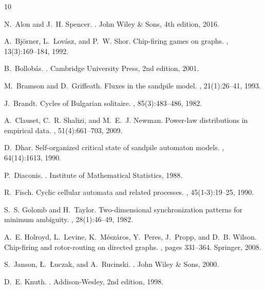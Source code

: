 \documentclass[11pt]{article}
\theoremstyle{definition}
\theoremstyle{remark}
\begin{document}
\begin{thebibliography}{10}

N.~Alon and J.~H. Spencer.
.
\newblock John Wiley \& Sons, 4th edition, 2016.

A.~Bj\"{o}rner, L.~Lov\'{a}sz, and P.~W. Shor.
\newblock Chip-firing games on graphs.
, 13(3):169--184, 1992.

B.~Bollob\'{a}s.
.
\newblock Cambridge University Press, 2nd edition, 2001.

M.~Bramson and D.~Griffeath.
\newblock Fluxes in the sandpile model.
, 21(1):26--41, 1993.

J.~Brandt.
\newblock Cycles of Bulgarian solitaire.
, 85(3):483--486, 1982.

A.~Clauset, C.~R. Shalizi, and M.~E.~J. Newman.
\newblock Power-law distributions in empirical data.
, 51(4):661--703, 2009.

D.~Dhar.
\newblock Self-organized critical state of sandpile automaton models.
, 64(14):1613, 1990.

P.~Diaconis.
.
\newblock Institute of Mathematical Statistics, 1988.

R.~Fisch.
\newblock Cyclic cellular automata and related processes.
, 45(1-3):19--25, 1990.

S.~S. Golomb and H.~Taylor.
\newblock Two-dimensional synchronization patterns for minimum ambiguity.
, 28(1):46--49, 1982.

A.~E. Holroyd, L.~Levine, K.~M\'{e}sz\'{a}ros, Y.~Peres, J.~Propp, and D.~B. Wilson.
\newblock Chip-firing and rotor-routing on directed graphs.
, pages 331--364. Springer, 2008.

S.~Janson, \L.~\L uczak, and A.~Rucinski.
.
\newblock John Wiley \& Sons, 2000.

D.~E. Knuth.
.
\newblock Addison-Wesley, 2nd edition, 1998.


\end{thebibliography}
\end{document}
